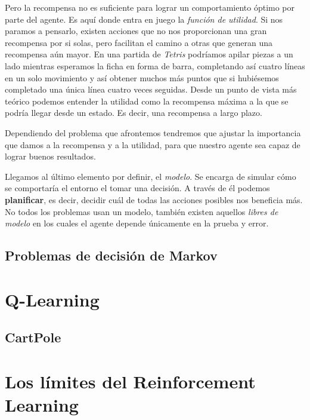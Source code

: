 Pero la recompensa no es suficiente para lograr un comportamiento óptimo por parte del agente. Es aquí donde entra en juego la \textit{función de utilidad}. Si nos paramos a pensarlo, existen acciones que no nos proporcionan una gran recompensa por si solas, pero facilitan el camino a otras que generan una recompensa aún mayor. En una partida de \textit{Tetris} podríamos apilar piezas a un lado mientras esperamos la ficha en forma de barra, completando así cuatro líneas en un solo movimiento y así obtener muchos más puntos que si hubiésemos completado una única línea cuatro veces seguidas. Desde un punto de vista más teórico podemos entender la utilidad como la recompensa máxima a la que se podría llegar desde un estado. Es decir, una recompensa a largo plazo.

Dependiendo del problema que afrontemos tendremos que ajustar la importancia que damos a la recompensa y a la utilidad, para que nuestro agente sea capaz de lograr buenos resultados.

Llegamos al último elemento por definir, el \textit{modelo}. Se encarga de simular cómo se comportaría el entorno el tomar una decisión. A través de él podemos \textbf{planificar}, es decir, decidir cuál de todas las acciones posibles nos beneficia más. No todos los problemas usan un modelo, también existen aquellos \textit{libres de modelo} en los cuales el agente depende únicamente en la prueba y error. 

\subsection{Problemas de decisión de Markov}

\section{Q-Learning}

\subsection{CartPole}

\section{Los límites del Reinforcement Learning}
 